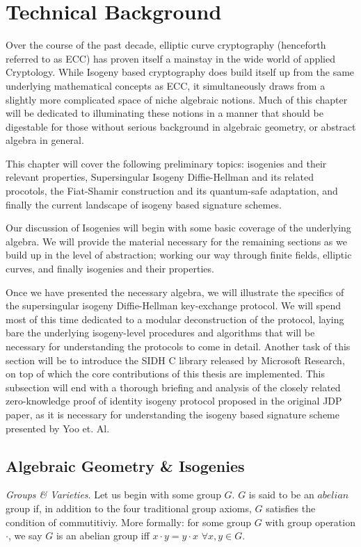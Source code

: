\chapter{Technical Background}

Over the course of the past decade, elliptic curve cryptography (henceforth referred to as ECC) has proven itself a mainstay in the wide world of applied Cryptology. While Isogeny based cryptography does build itself up from the same underlying mathematical concepts as ECC, it simultaneously draws from a slightly more complicated space of niche algebraic notions. Much of this chapter will be dedicated to illuminating these notions in a manner that should be digestable for those without serious background in algebraic geometry, or abstract algebra in general.

This chapter will cover the following preliminary topics: isogenies and their relevant properties, Supersingular Isogeny Diffie-Hellman and its related procotols, the Fiat-Shamir construction and its quantum-safe adaptation, and finally the current landscape of isogeny based signature schemes.

Our discussion of Isogenies will begin with some basic coverage of the underlying algebra. We will provide the material necessary for the remaining sections as we build up in the level of abstraction; working our way through finite fields, elliptic curves, and finally isogenies and their properties.

Once we have presented the necessary algebra, we will illustrate the specifics of the supersingular isogeny Diffie-Hellman key-exchange protocol. We will spend most of this time dedicated to a modular deconstruction of the protocol, laying bare the underlying isogeny-level procedures and algorithms that will be necessary for understanding the protocols to come in detail. Another task of this section will be to introduce the SIDH C library released by Microsoft Research, on top of which the core contributions of this thesis are implemented. This subsection will end with a thorough briefing and analysis of the closely related zero-knowledge proof of identity isogeny protocol proposed in the original JDP paper, as it is necessary for understanding the isogeny based signature scheme presented by Yoo et. Al.\\

\section{Algebraic Geometry \& Isogenies}
\emph{Groups \& Varieties}. Let us begin with some group $G$. $G$ is said to be an $abelian$ group if, in addition to the four traditional group axioms, $G$ satisfies the condition of commutitiviy. More formally: for some group $G$ with group operation $\cdot$, we say $G$ is an abelian group iff $x \cdot y = y \cdot x$ $\forall x, y \in G$.

